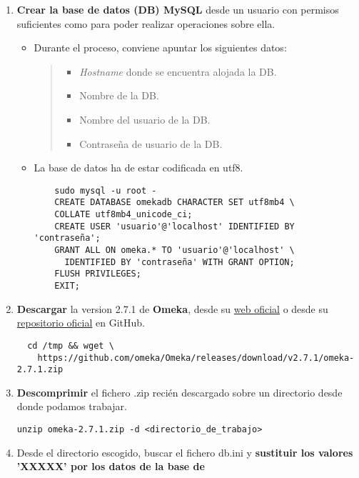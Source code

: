 \begin{enumerate}
\def\labelenumi{\arabic{enumi}.}
\tightlist
\item
  \textbf{Crear la base de datos (DB) MySQL} desde un usuario con
  permisos suficientes como para poder realizar operaciones sobre ella.
  \begin{itemize}
  \item
    Durante el proceso, conviene apuntar los siguientes datos:
    \begin{quote}
    \begin{itemize}
    \tightlist
    \item
      \emph{Hostname} donde se encuentra alojada la DB.
    \item
      Nombre de la DB.
    \item
      Nombre del usuario de la DB.
    \item
      Contraseña de usuario de la DB.
    \end{itemize}
    \end{quote}
  \item
    La base de datos ha de estar codificada en {utf8}.
    \begin{verbatim}
 	sudo mysql -u root -
   	CREATE DATABASE omekadb CHARACTER SET utf8mb4 \
   	COLLATE utf8mb4_unicode_ci;
   	CREATE USER 'usuario'@'localhost' IDENTIFIED BY 'contraseña';
   	GRANT ALL ON omeka.* TO 'usuario'@'localhost' \
      IDENTIFIED BY 'contraseña' WITH GRANT OPTION;
   	FLUSH PRIVILEGES;
   	EXIT;
   	\end{verbatim}
  \end{itemize}
  \item
  \textbf{Descargar} la version 2.7.1 de \textbf{Omeka}, desde su \href{https://omeka.org/classic/download/}{web oficial} o desde su \href{http://github.com/omeka/Omeka}{repositorio oficial} en
  GitHub.
  \begin{verbatim}
  cd /tmp && wget \
    https://github.com/omeka/Omeka/releases/download/v2.7.1/omeka-2.7.1.zip
  \end{verbatim}
\item
  \textbf{Descomprimir} el fichero {.zip} recién descargado sobre un
  directorio desde donde podamos trabajar.
\begin{verbatim}
unzip omeka-2.7.1.zip -d <directorio_de_trabajo>
\end{verbatim}
\item
  Desde el directorio escogido, buscar el fichero {db.ini} y
  \textbf{sustituir los valores 'XXXXX' por los datos de la base de
}
\end{enumerate}
